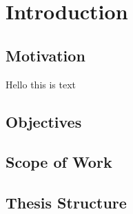 \section{Introduction}
\subsection{Motivation}
Hello this is text

\subsection{Objectives}

\subsection{Scope of Work}

\subsection{Thesis Structure}